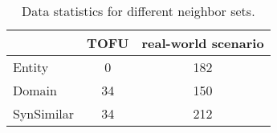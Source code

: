 \begin{table}[h]
    \centering
    \begin{tabular}{lcc}
        \hline
        & \textbf{TOFU} & \textbf{real-world scenario} \\
        \hline
        Entity      & 0   & 182 \\
        Domain      & 34  & 150 \\
        SynSimilar  & 34  & 212 \\
        \hline
    \end{tabular}
    \caption{Data statistics for different neighbor sets.}
    \label{tab:data-statistics-neighbor}
\end{table}
